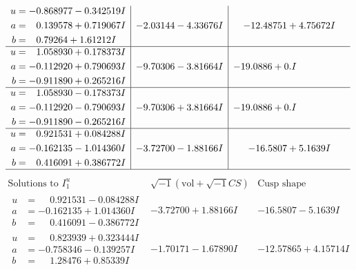 \documentclass[1p]{elsarticle_modified}
\theoremstyle{definition}
\newcommand{\I}{\sqrt{-1}}
\begin{document}
$$\begin{array}{c|c|c}
\begin{aligned}
u &= -0.868977 - 0.342519 I \\
a &= \phantom{-}0.139578 + 0.719067 I \\
b &= \phantom{-}0.79264 + 1.61212 I\end{aligned}
 & -2.03144 - 4.33676 I & -12.48751 + 4.75672 I \\ \hline\begin{aligned}
u &= \phantom{-}1.058930 + 0.178373 I \\
a &= -0.112920 + 0.790693 I \\
b &= -0.911890 + 0.265216 I\end{aligned}
 & -9.70306 - 3.81664 I & -19.0886 + 0. I\phantom{ +0.000000I} \\ \hline\begin{aligned}
u &= \phantom{-}1.058930 - 0.178373 I \\
a &= -0.112920 - 0.790693 I \\
b &= -0.911890 - 0.265216 I\end{aligned}
 & -9.70306 + 3.81664 I & -19.0886 + 0. I\phantom{ +0.000000I} \\ \hline\begin{aligned}
u &= \phantom{-}0.921531 + 0.084288 I \\
a &= -0.162135 - 1.014360 I \\
b &= \phantom{-}0.416091 + 0.386772 I\end{aligned}
 & -3.72700 - 1.88166 I & -16.5807 + 5.1639 I\\
 \hline 
 \end{array}$$\newpage$$\begin{array}{c|c|c}  
\text{Solutions to }I^u_{1}& \I (\text{vol} + \sqrt{-1}CS) & \text{Cusp shape}\\
 \hline 
\begin{aligned}
u &= \phantom{-}0.921531 - 0.084288 I \\
a &= -0.162135 + 1.014360 I \\
b &= \phantom{-}0.416091 - 0.386772 I\end{aligned}
 & -3.72700 + 1.88166 I & -16.5807 - 5.1639 I \\ \hline\begin{aligned}
u &= \phantom{-}0.823939 + 0.323444 I \\
a &= -0.758346 - 0.139257 I \\
b &= \phantom{-}1.28476 + 0.85339 I\end{aligned}
 & -1.70171 - 1.67890 I & -12.57865 + 4.15714 I \\ \hline\begin{aligned}

\end{aligned}
\end{array}$$
\end{document}
